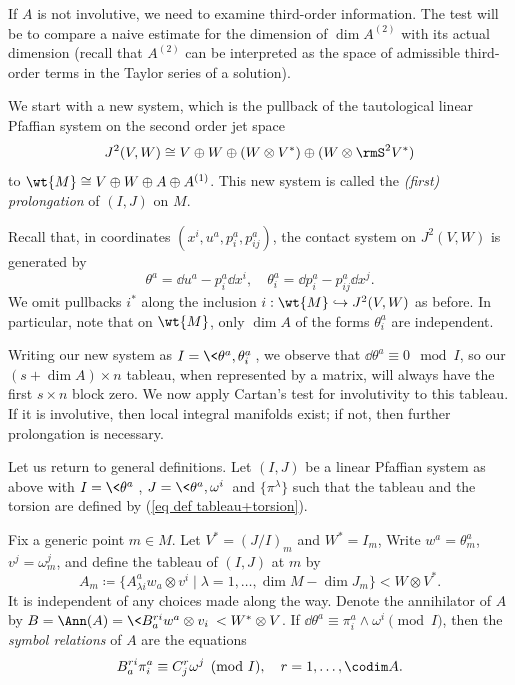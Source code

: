 \begin{example}
    If $A$ is not involutive, we need to examine third-order information. The test will be to compare a naive estimate for the dimension of $\dim A^{(2)}$ with its actual dimension (recall that $A^{(2)}$ can be interpreted as the space of admissible third-order terms in the Taylor series of a solution). 

    We start with a new system, which is the pullback of the tautological linear Pfaffian system on the second order jet space 
    \[J^2(V,W)\cong V\oplus W\oplus (W\otimes V^\ast)\oplus (W\otimes \rmS^2 V^\ast)\]
    to $\wt{M}\cong V\oplus W\oplus A\oplus A^{(1)}$. This new system is called the \emph{(first) prolongation} of $(I,J)$ on $M$.

    Recall that, in coordinates $(x^i,u^a,p^a_i,p^a_{ij})$, the contact system on $J^2(V,W)$ is generated by 
    \[\theta^a=\dd u^a-p^a_i\dd x^i,\quad \theta^a_i=\dd p^a_i-p^a_{ij}\dd x^j.\]
    We omit pullbacks $i^\ast$ along the inclusion $i:\wt{M}\hookrightarrow J^2(V,W)$ as before. In particular, note that on $\wt{M}$, only $\dim A$ of the forms $\theta^a_i$ are independent. 

    Writing our new system as $I=\<\theta^a,\theta^a_i\>$, we observe that $\dd\theta^a\equiv 0\mod{I}$, so our $(s+\dim A)\times n$ tableau, when represented by a matrix, will always have the first $s\times n$ block zero. We now apply Cartan's test for involutivity to this tableau. If it is involutive, then local integral manifolds exist; if not, then further prolongation is necessary.
\end{example}


Let us return to general definitions. Let $(I,J)$ be a linear Pfaffian system as above with $I=\<\theta^a\>$, $J=\<\theta^a,\omega^i\>$ and $\{\pi^\lambda\}$ such that the tableau and the torsion are defined by (\ref{eq def tableau+torsion}).

\begin{defn}
    Fix a generic point $m\in M$. Let $V^\ast=(J\slash I)_m$ and $W^\ast=I_m$, Write $w^a=\theta^a_m$, $v^j=\omega^j_m$, and define the tableau of $(I,J)$ at $m$ by 
    \[A_m\coloneqq \{A^a_{\lambda i} w_a\otimes v^i\mid \lambda=1,\ldots,\dim M-\dim J_m\}<W\otimes V^\ast.\]
    It is independent of any choices made along the way. Denote the annihilator of $A$ by $B=\Ann(A)=\<B^{ri}_a w^a\otimes v_i\>< W^\ast\otimes V$. If $\dd\theta^a\equiv \pi^a_i\wedge \omega^i\pmod{I}$, then the \emph{symbol relations} of $A$ are the equations
    \[B^{ri}_a\pi^a_i\equiv C^r_j \omega^j\pmod{I},\quad r=1,\ldots,\codim A.\]
\end{defn}

